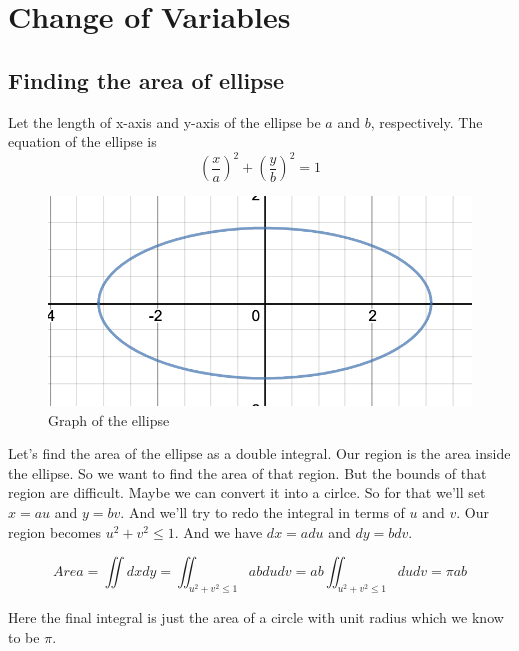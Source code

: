 

\chapter{Change of Variables}

\bigbreak

\section{Finding the area of ellipse}

Let the length of x-axis and y-axis of the ellipse be $a$ and $b$, respectively.
The equation of the ellipse is 
$$ \left( \frac{x}{a} \right)^2 + \left( \frac{y}{b} \right)^2 = 1 $$

\begin{figure}[ht!]
    \centering
    \includegraphics[scale=0.5]{./images/lecture_14_figure_1.png}
    \caption{Graph of the ellipse}
\end{figure}

Let's find the area of the ellipse as a double integral.
Our region is the area inside the ellipse. So we want to find the area of that region.
But the bounds of that region are difficult.
Maybe we can convert it into a cirlce. So for that we'll set $x = au$ and $y = bv$.
And we'll try to redo the integral in terms of $u$ and $v$.
Our region becomes $u^2 + v^2 \leq 1$. And we have $dx = adu$ and $dy = bdv$.

$$
Area = \iint dx dy = \iint_{u^2+v^2 \leq 1} ab du dv = ab \iint_{u^2+v^2 \leq 1} du dv = \pi a b 
$$

Here the final integral is just the area of a circle with unit radius which we know to be $\pi$.


